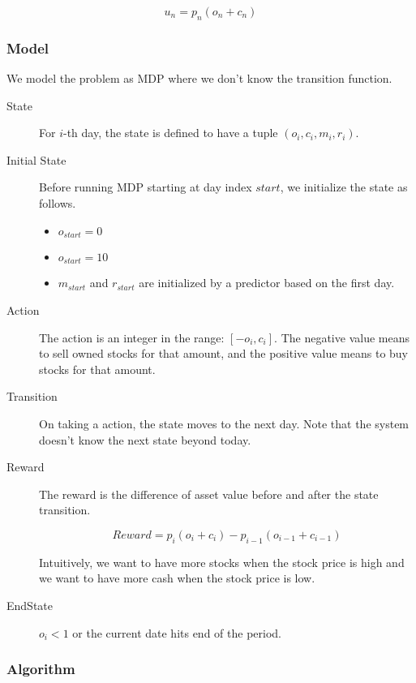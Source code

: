 \documentclass[twocolumn,10pt]{asme2ej}
\begin{document}
\[
u_n = p_n(o_n + c_n)
\]

\subsubsection{Model}

We model the problem as MDP where we don't know the transition function.

\begin{description}
\item[State] For $i$-th day, the state is defined to have a tuple $(o_i,c_i,m_i,r_i)$.

\item[Initial State] Before running MDP starting at day index $start$,
  we initialize the state as follows.
  \begin{itemize}
  \item $o_{start} = 0$
  \item $o_{start} = 10$
  \item $m_{start}$ and $r_{start}$ are initialized by a predictor
    based on the first day.
  \end{itemize}
  
\item[Action] The action is an integer in the range: $[-o_i,c_i]$. The
  negative value means to sell owned stocks for that amount, and the
  positive value means to buy stocks for that amount.

\item[Transition] On taking a action, the state moves to the next
  day. Note that the system doesn't know the next state beyond today.

\item[Reward] The reward is the difference of asset value before and
  after the state transition. 
  
  \[
  Reward = p_i(o_{i} + c_{i}) - p_{i-1}(o_{i-1} + c_{i-1})
  \]
  
  Intuitively, we want to have more stocks when the stock price is
  high and we want to have more cash when the stock price is low.

\item[EndState] $o_i < 1$ or the current date hits end of the period.
\end{description}

\subsubsection{Algorithm}
\end{document}
